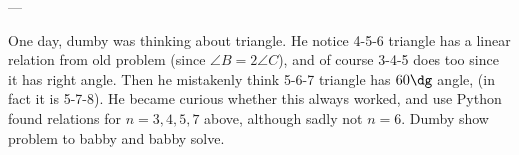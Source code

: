 ---

One day, dumby was thinking about triangle.
He notice 4-5-6 triangle has a linear relation from old problem
(since $\angle B = 2\angle C$),
and of course 3-4-5 does too since it has right angle.
Then he mistakenly think 5-6-7 triangle has $60\dg$ angle,
(in fact it is 5-7-8).
He became curious whether this always worked,
and use Python found relations for $n=3,4,5,7$ above,
although sadly not $n=6$.
Dumby show problem to babby and babby solve.
